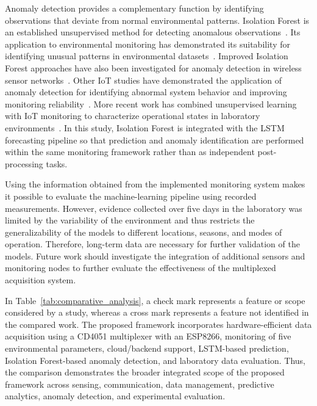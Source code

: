 ﻿\documentclass[journal]{IEEEtran}
\begin{document}
Anomaly detection provides a complementary function by identifying observations
that deviate from normal environmental patterns. Isolation Forest is an
established unsupervised method for detecting anomalous observations~\cite{ref30}.
Its application to environmental monitoring has demonstrated its suitability
for identifying unusual patterns in environmental datasets~\cite{ref31}.
Improved Isolation Forest approaches have also been investigated for anomaly
detection in wireless sensor networks~\cite{ref32}. Other IoT studies have
demonstrated the application of anomaly detection for identifying abnormal
system behavior and improving monitoring reliability~\cite{ref33}. More
recent work has combined unsupervised learning with IoT monitoring to
characterize operational states in laboratory environments~\cite{ref34}. In
this study, Isolation Forest is integrated with the LSTM forecasting pipeline
so that prediction and anomaly identification are performed within the same
monitoring framework rather than as independent post-processing tasks.

Using the information obtained from the implemented monitoring system makes
it possible to evaluate the machine-learning pipeline using recorded
measurements. However, evidence collected over five days in the laboratory
was limited by the variability of the environment and thus restricts the
generalizability of the models to different locations, seasons, and modes of
operation. Therefore, long-term data are necessary for further validation of
the models. Future work should investigate the integration of additional
sensors and monitoring nodes to further evaluate the effectiveness of the
multiplexed acquisition system.




In Table~\ref{tab:comparative_analysis}, a check mark represents a feature or
scope considered by a study, whereas a cross mark represents a feature not
identified in the compared work. The proposed framework incorporates
hardware-efficient data acquisition using a CD4051 multiplexer with an
ESP8266, monitoring of five environmental parameters, cloud/backend support,
LSTM-based prediction, Isolation Forest-based anomaly detection, and
laboratory data evaluation. Thus, the comparison demonstrates the broader
integrated scope of the proposed framework across sensing, communication,
data management, predictive analytics, anomaly detection, and experimental
evaluation.
\end{document}

